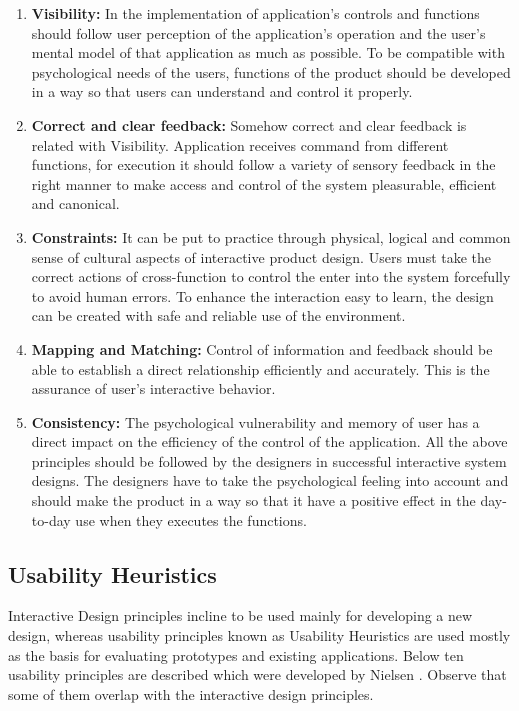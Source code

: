 \begin{enumerate}
\item \textbf{Visibility:} In the implementation of application's controls and
functions should follow user perception of the application's operation and the
user's mental model of that application as much as possible. To be compatible
with psychological needs of the users, functions of the product should be
developed in a way so that users can understand and control it properly.

\item  \textbf{Correct and clear feedback:} Somehow  correct and clear feedback
is related with Visibility. Application receives command from different
functions, for execution it should follow a variety of sensory feedback in the
right manner to make access and control of the  system pleasurable, efficient
and canonical.

\item  \textbf{Constraints:} It can be put to practice through physical, logical
and common sense of cultural aspects of interactive product design. Users must
take the correct actions of cross-function to control the enter into the system
forcefully to avoid human errors. To enhance the interaction easy to learn, the
design can be created with safe and reliable use of the environment.

\item  \textbf{Mapping and Matching:} Control of information and
feedback should be able to establish a direct relationship efficiently and
accurately. This is the assurance of user's interactive behavior.

\item \textbf{Consistency:} The psychological vulnerability and memory of user
has a direct impact on the efficiency of the control of the application.  All
the above principles should be followed by the designers in successful
interactive system designs. The designers have to take the psychological feeling
into account and should make the product in a way so that it have a positive
effect in the day-to-day use when they executes the functions.

\end{enumerate}

\subsection{Usability Heuristics}
\label{sec:HeuristicsUsability}
Interactive Design principles incline to be used mainly for developing a new
design, whereas usability principles known as Usability Heuristics are used
mostly as the basis for evaluating prototypes and existing applications. Below
ten usability principles are described which were developed by Nielsen
\cite{Nielsen1990}. Observe that some of them overlap with the interactive
design principles.

